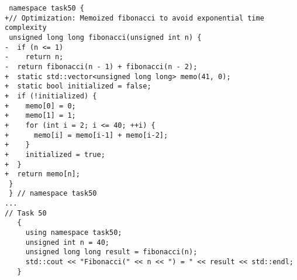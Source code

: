 \begin{verbatim}
 namespace task50 {
+// Optimization: Memoized fibonacci to avoid exponential time complexity
 unsigned long long fibonacci(unsigned int n) {
-  if (n <= 1)
-    return n;
-  return fibonacci(n - 1) + fibonacci(n - 2);
+  static std::vector<unsigned long long> memo(41, 0);
+  static bool initialized = false;
+  if (!initialized) {
+    memo[0] = 0;
+    memo[1] = 1;
+    for (int i = 2; i <= 40; ++i) {
+      memo[i] = memo[i-1] + memo[i-2];
+    }
+    initialized = true;
+  }
+  return memo[n];
 }
 } // namespace task50
...
// Task 50
   {
     using namespace task50;
     unsigned int n = 40;
     unsigned long long result = fibonacci(n);
     std::cout << "Fibonacci(" << n << ") = " << result << std::endl;
   }
\end{verbatim}